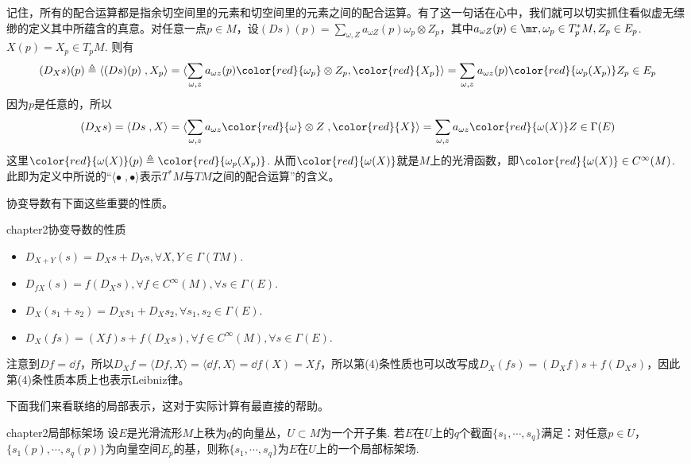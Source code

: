 记住，所有的配合运算都是指余切空间里的元素和切空间里的元素之间的配合运算。有了这一句话在心中，我们就可以切实抓住看似虚无缥缈的定义其中所蕴含的真意。对任意一点$p\in M$，设$(Ds)(p)=\sum_{ \omega,Z }a_{\omega Z}(p)  \omega_{p}\otimes Z_{p}$，其中$a_{\omega Z}(p)\in \mr,\omega_{p}\in T^{\ast}_{p}M,Z_{p}\in E_{p}$. $X(p)=X_{p}\in T_{p}M$. 则有
\[
(D_{X}s)(p)\triangleq\langle (Ds)(p)\;,X_{p} \rangle =\langle \sum_{ \omega,z }a_{\omega z}(p)  {\color{red}{\omega_{p}}}\otimes Z_{p},{\color{red}{X_{p}}} \rangle=\sum_{ \omega,z }a_{\omega z}(p)  {\color{red}{\omega_{p}(X_{p})}}  Z_{p}\in E_{p}
\]
因为$p$是任意的，所以
\[
(D_{X}s)=\langle Ds\;,X \rangle =\langle \sum_{ \omega,z }a_{\omega z}  {\color{red}{\omega}}\otimes Z\;,{\color{red}{X}} \rangle=\sum_{ \omega,z }a_{\omega z}  {\color{red}{\omega(X)}}  Z\in \Gamma(E)
\]
这里${\color{red}{\omega(X)}}(p)\triangleq{\color{red}{\omega_{p}(X_{p})}}$. 从而${\color{red}{\omega(X)}}$就是$M$上的光滑函数，即${\color{red}{\omega(X)}}\in C^{\infty}(M)$. 此即为定义中所说的“$\langle \bullet\;,\bullet\rangle $表示$T^{\ast}M$与$TM$之间的配合运算”的含义。

协变导数有下面这些重要的性质。
\begin{mythm}{}{chapter2协变导数的性质}
	\begin{itemize}
		\item[(1)] $D_{X+Y}(s)=D_{X}s+D_{Y}s,\forall X,Y\in \Gamma(TM)$.
		\item[(2)] $D_{fX}(s)=f(D_{X}s),\forall f\in C^{\infty}(M),\forall s\in \Gamma(E)$.
		\item[(3)] $D_{X}(s_{1}+s_{2})=D_{X}s_{1}+D_{X}s_{2},\forall s_{1},s_{2}\in\Gamma(E) $.
		\item[(4)] $D_{X}(fs)=(Xf)s+f(D_{X}s),\forall f\in C^{\infty}(M),\forall s\in \Gamma(E)$.
	\end{itemize}
\end{mythm}

注意到$Df=\dd f$，所以$D_{X}f=\langle Df,X \rangle=\langle\dd f,X \rangle=\dd f(X)=Xf$，所以第(4)条性质也可以改写成$D_{X}(fs)=(D_{X}f)s+f(D_{X}s)$，因此第(4)条性质本质上也表示Leibniz律。

下面我们来看联络的局部表示，这对于实际计算有最直接的帮助。

\begin{mydef}{}{chapter2局部标架场}
	设$E$是光滑流形$M$上秩为$q$的向量丛，$U\subset M$为一个开子集. 若$E$在$U$上的$q$个截面$\{s_{1},\cdots,s_{q} \}$满足：对任意$p\in U$，$\{s_{1}(p),\cdots,s_{q}(p) \}$为向量空间$E_{p}$的基，则称$\{s_{1},\cdots,s_{q} \}$为$E$在$U$上的一个局部标架场.
\end{mydef}


